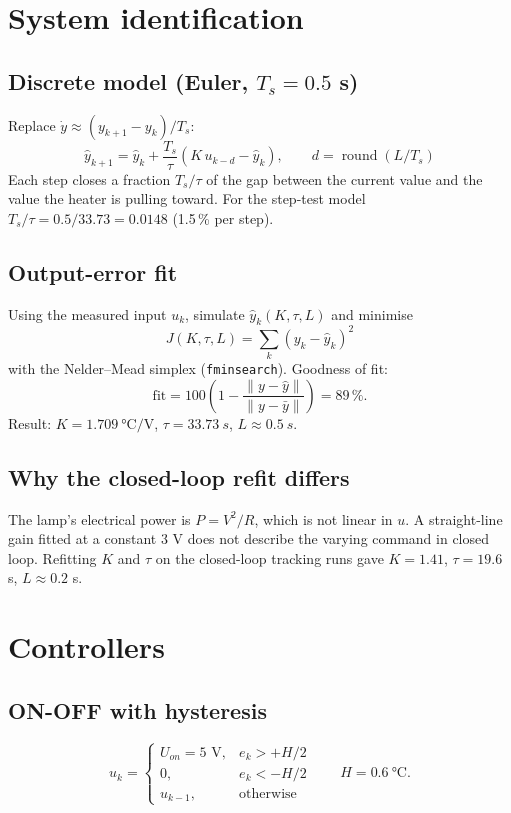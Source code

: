 \documentclass[11pt,a4paper]{article}
\begin{document}
\section{System identification}

\subsection{Discrete model (Euler, $T_s = 0.5$ s)}
Replace $\dot y \approx (y_{k+1} - y_k)/T_s$:
\[
\boxed{\;\hat y_{k+1} = \hat y_k + \frac{T_s}{\tau}\left(K\,u_{k-d} - \hat y_k\right),\qquad d = \operatorname{round}(L/T_s)\;}
\]
Each step closes a fraction $T_s/\tau$ of the gap between the current value and the value the
heater is pulling toward. For the step-test model $T_s/\tau = 0.5/33.73 = 0.0148$ (1.5\,\% per step).

\subsection{Output-error fit}
Using the measured input $u_k$, simulate $\hat y_k(K,\tau,L)$ and minimise
\[
J(K,\tau,L) = \sum_{k}\left(y_k - \hat y_k\right)^2
\]
with the Nelder--Mead simplex (\texttt{fminsearch}). Goodness of fit:
\[
\text{fit} = 100\left(1 - \frac{\lVert y - \hat y\rVert}{\lVert y - \bar y\rVert}\right) = 89\,\%.
\]
Result: $K = \SI{1.709}{\celsius\per\volt}$, $\tau = \SI{33.73}{s}$, $L \approx \SI{0.5}{s}$.

\subsection{Why the closed-loop refit differs}
The lamp's electrical power is $P = V^2/R$, which is not linear in $u$. A straight-line gain fitted
at a constant 3 V does not describe the varying command in closed loop. Refitting $K$ and $\tau$ on
the closed-loop tracking runs gave $K = 1.41$, $\tau = 19.6$ s, $L \approx 0.2$ s.

\section{Controllers}

\subsection{ON-OFF with hysteresis}
\[
u_k = \begin{cases} U_{on} = 5\text{ V}, & e_k > +H/2\\ 0, & e_k < -H/2\\ u_{k-1}, & \text{otherwise}\end{cases}
\qquad H = \SI{0.6}{\celsius}.
\]
\end{document}

